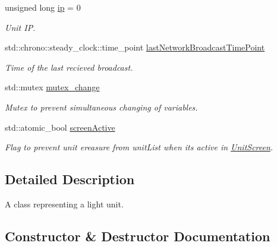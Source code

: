 \begin{DoxyCompactItemize}
\mbox{\label{classLightUnit_a7d490bbccb134d200628eee46ab8fb3d}} 
unsigned long \mbox{\hyperlink{classLightUnit_a7d490bbccb134d200628eee46ab8fb3d}{ip}} = 0
\begin{DoxyCompactList}\small\item\em Unit IP. \end{DoxyCompactList}\item 
\mbox{\label{classLightUnit_ac5f86e26fe02c192736cddd1d06af583}} 
std\+::chrono\+::steady\+\_\+clock\+::time\+\_\+point \mbox{\hyperlink{classLightUnit_ac5f86e26fe02c192736cddd1d06af583}{last\+Network\+Broadcast\+Time\+Point}}
\begin{DoxyCompactList}\small\item\em Time of the last recieved broadcast. \end{DoxyCompactList}\item 
\mbox{\label{classLightUnit_a4380f5dead3b35443b09f1dbbe44af55}} 
std\+::mutex \mbox{\hyperlink{classLightUnit_a4380f5dead3b35443b09f1dbbe44af55}{mutex\+\_\+change}}
\begin{DoxyCompactList}\small\item\em Mutex to prevent simultaneous changing of variables. \end{DoxyCompactList}\item 
\mbox{\label{classLightUnit_ad1053b699435285eee81f2ba49c12617}} 
std\+::atomic\+\_\+bool \mbox{\hyperlink{classLightUnit_ad1053b699435285eee81f2ba49c12617}{screen\+Active}}
\begin{DoxyCompactList}\small\item\em Flag to prevent unit ereasure from unit\+List when it\textquotesingle{}s active in \mbox{\hyperlink{classUnitScreen}{Unit\+Screen}}. \end{DoxyCompactList}\end{DoxyCompactItemize}


\subsection{Detailed Description}
A class representing a light unit. 

\subsection{Constructor \& Destructor Documentation}
\mbox{\label{classLightUnit_aa44c2d7b6e764c9bbca0f5ab19a31553}} 
